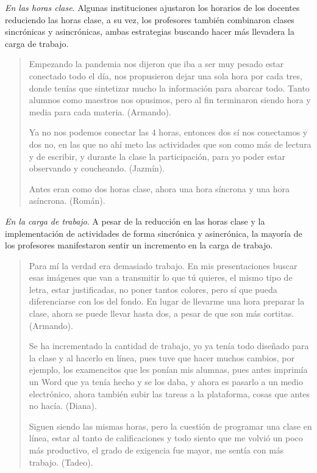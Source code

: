 \documentclass[spanish]{textolivre}
\begin{document}
\textit{En las horas clase}. Algunas instituciones ajustaron los horarios de los docentes reduciendo las horas clase, a su vez, los profesores también combinaron clases sincrónicas y asincrónicas, ambas estrategias buscando hacer más llevadera la carga de trabajo.

\begin{quote}
  Empezando la pandemia nos dijeron que iba a ser muy pesado estar conectado todo el día, nos propusieron dejar una sola hora por cada tres, donde tenías que sintetizar mucho la información para abarcar todo. Tanto alumnos como maestros nos opusimos, pero al fin terminaron siendo hora y media para cada materia. (Armando).  

    Ya no nos podemos conectar las 4 horas, entonces dos sí nos conectamos y dos no, en las que no ahí meto las actividades que son como más de lectura y de escribir, y durante la clase la participación, para yo poder estar observando y coucheando. (Jazmín).

    Antes eran como dos horas clase, ahora una hora síncrona y una hora asíncrona. (Román).
\end{quote}

\textit{En la carga de trabajo}. A pesar de la reducción en las horas clase y la implementación de actividades de forma sincrónica y asincrónica, la mayoría de los profesores manifestaron sentir un incremento en la carga de trabajo.

\begin{quote}
    Para mí la verdad era demasiado trabajo. En mis presentaciones buscar esas imágenes que van a transmitir lo que tú quieres, el mismo tipo de letra, estar justificadas, no poner tantos colores, pero sí que pueda diferenciarse con los del fondo. En lugar de llevarme una hora preparar la clase, ahora se puede llevar hasta dos, a pesar de que son más cortitas. (Armando).

    Se ha incrementado la cantidad de trabajo, yo ya tenía todo diseñado para la clase y al hacerlo en línea, pues tuve que hacer muchos cambios, por ejemplo, los examencitos que les ponían mis alumnas, pues antes imprimía un Word que ya tenía hecho y se los daba, y ahora es pasarlo a un medio electrónico, ahora también subir las tareas a la plataforma, cosas que antes no hacía. (Diana).

    Siguen siendo las mismas horas, pero la cuestión de programar una clase en línea, estar al tanto de calificaciones y todo siento que me volvió un poco más productivo, el grado de exigencia fue mayor, me sentía con más trabajo. (Tadeo).
\end{quote}
\end{document}
